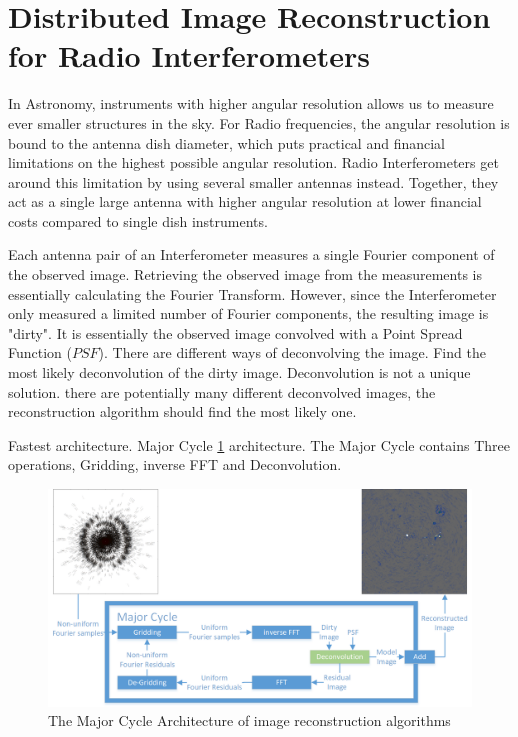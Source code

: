 \pagebreak
\section{Distributed Image Reconstruction for Radio Interferometers}
In Astronomy, instruments with higher angular resolution allows us to measure ever smaller structures in the sky. For Radio frequencies, the angular resolution is bound to the antenna dish diameter, which puts practical and financial limitations on the highest possible angular resolution. Radio Interferometers get around this limitation by using several smaller antennas instead. Together, they act as a single large antenna with higher angular resolution at lower financial costs compared to single dish instruments.

Each antenna pair of an Interferometer measures a single Fourier component of the observed image. Retrieving the observed image from the measurements is essentially calculating the Fourier Transform. However, since the Interferometer only measured a limited number of Fourier components, the resulting image is "dirty". It is essentially the observed image convolved with a Point Spread Function ($PSF$).
There are different ways of deconvolving the image. Find the most likely deconvolution of the dirty image. Deconvolution is not a unique solution. there are potentially many different deconvolved images, the reconstruction algorithm should find the most likely one.

Fastest architecture. Major Cycle \ref{hypo:major3} architecture. The Major Cycle contains Three operations, Gridding, inverse FFT and Deconvolution. 

\begin{figure}[h]
	\centering
	\includegraphics[width=0.80\linewidth]{./chapters/02.hypo/Major-Minor3.png}
	\caption{The Major Cycle Architecture of image reconstruction algorithms}
	\label{hypo:major3}
\end{figure}

